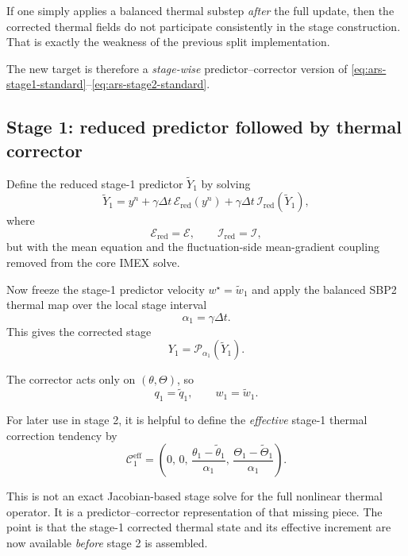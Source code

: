 \documentclass[11pt]{article}
\begin{document}
If one simply applies a balanced thermal substep \emph{after} the full update,
then the corrected thermal fields do not participate consistently in the stage
construction. That is exactly the weakness of the previous split
implementation.

The new target is therefore a \emph{stage-wise} predictor--corrector version of
\eqref{eq:ars-stage1-standard}--\eqref{eq:ars-stage2-standard}.

\subsection{Stage 1: reduced predictor followed by thermal corrector}

Define the reduced stage-1 predictor $\widetilde Y_1$ by solving
\begin{equation}
\widetilde Y_1
=
y^n
+
\gamma \Delta t\,\mathcal E_{\mathrm{red}}(y^n)
+
\gamma \Delta t\,\mathcal I_{\mathrm{red}}(\widetilde Y_1),
\label{eq:stage1-predictor}
\end{equation}
where
\[
\mathcal E_{\mathrm{red}} = \mathcal E,
\qquad
\mathcal I_{\mathrm{red}} = \mathcal I,
\]
but with the mean equation and the fluctuation-side mean-gradient coupling
removed from the core IMEX solve.

Now freeze the stage-1 predictor velocity $w^\star = \widetilde w_1$ and apply
the balanced SBP2 thermal map over the local stage interval
\[
\alpha_1 = \gamma \Delta t.
\]
This gives the corrected stage
\begin{equation}
Y_1
=
\mathcal P_{\alpha_1}(\widetilde Y_1).
\label{eq:stage1-corrector}
\end{equation}

The corrector acts only on $(\theta,\Theta)$, so
\[
q_1 = \widetilde q_1,
\qquad
w_1 = \widetilde w_1.
\]

For later use in stage 2, it is helpful to define the \emph{effective} stage-1
thermal correction tendency by
\begin{equation}
\mathcal C_1^{\mathrm{eff}}
=
\left(
0,\,
0,\,
\frac{\theta_1 - \widetilde\theta_1}{\alpha_1},\,
\frac{\Theta_1 - \widetilde\Theta_1}{\alpha_1}
\right).
\label{eq:C1-eff}
\end{equation}

This is not an exact Jacobian-based stage solve for the full nonlinear thermal
operator. It is a predictor--corrector representation of that missing piece.
The point is that the stage-1 corrected thermal state and its effective
increment are now available \emph{before} stage 2 is assembled.
\end{document}
